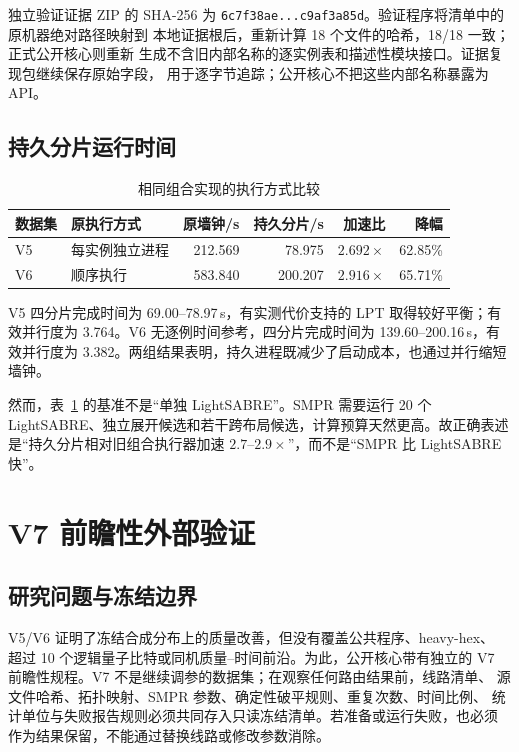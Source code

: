 \documentclass[11pt,a4paper]{article}
\begin{document}
独立验证证据 ZIP 的 SHA-256 为
\texttt{6c7f38ae...c9af3a85d}。验证程序将清单中的原机器绝对路径映射到
本地证据根后，重新计算 18 个文件的哈希，18/18 一致；正式公开核心则重新
生成不含旧内部名称的逐实例表和描述性模块接口。证据复现包继续保存原始字段，
用于逐字节追踪；公开核心不把这些内部名称暴露为 API。

\subsection{持久分片运行时间}

\begin{table}[H]
\centering
\small
\caption{相同组合实现的执行方式比较}
\label{tab:runtime}
\begin{tabular}{llrrrr}
\toprule
数据集 & 原执行方式 & 原墙钟/s & 持久分片/s & 加速比 & 降幅 \\
\midrule
V5 & 每实例独立进程 & 212.569 & 78.975 & $2.692\times$ & 62.85\% \\
V6 & 顺序执行 & 583.840 & 200.207 & $2.916\times$ & 65.71\% \\
\bottomrule
\end{tabular}
\end{table}

V5 四分片完成时间为 69.00--78.97\,s，有实测代价支持的 LPT 取得较好平衡；有效并行度为 3.764。V6 无逐例时间参考，四分片完成时间为 139.60--200.16\,s，有效并行度为 3.382。两组结果表明，持久进程既减少了启动成本，也通过并行缩短墙钟。

然而，表~\ref{tab:runtime} 的基准不是“单独 LightSABRE”。SMPR 需要运行 20 个 LightSABRE、独立展开候选和若干跨布局候选，计算预算天然更高。故正确表述是“持久分片相对旧组合执行器加速 $2.7$--$2.9\times$”，而不是“SMPR 比 LightSABRE 快”。

\section{V7 前瞻性外部验证}

\subsection{研究问题与冻结边界}

V5/V6 证明了冻结合成分布上的质量改善，但没有覆盖公共程序、heavy-hex、
超过 10 个逻辑量子比特或同机质量--时间前沿。为此，公开核心带有独立的
V7 前瞻性规程。V7 不是继续调参的数据集；在观察任何路由结果前，线路清单、
源文件哈希、拓扑映射、SMPR 参数、确定性破平规则、重复次数、时间比例、
统计单位与失败报告规则必须共同存入只读冻结清单。若准备或运行失败，也必须
作为结果保留，不能通过替换线路或修改参数消除。
\end{document}
